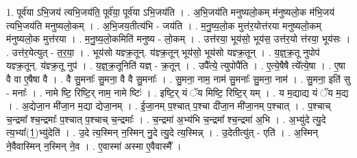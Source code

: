 \documentclass[17pt]{extarticle}
\begin{document}
1. पूर्व॑या ऽभि॒जय॑ त्यभि॒जय॑ति॒ पूर्व॑या॒ पूर्व॑या ऽभि॒जय॑ति । . अ॒भि॒जय॑ति मनुष्यलो॒कम् म॑नुष्यलो॒क म॑भि॒जय॑ त्यभि॒जय॑ति मनुष्यलो॒कम् । . अ॒भि॒जय॒तीत्य॑भि - जय॑ति । . म॒नु॒ष्य॒लो॒क मुत्त॑र॒योत्त॑रया मनुष्यलो॒कम् म॑नुष्यलो॒क मुत्त॑रया । . म॒नु॒ष्य॒लो॒कमिति॑ मनुष्य - लो॒कम् । . उत्त॑रया॒ भूय॑सो॒ भूय॑स॒ उत्त॑र॒यो त्त॑रया॒ भूय॑सः । . उत्त॑र॒येत्युत् - त॒र॒या॒ । . भूय॑सो यज्ञ्क्र॒तून्. य॑ज्ञ्क्र॒तून् भूय॑सो॒ भूय॑सो यज्ञ्क्र॒तून् । . य॒ज्ञ्॒क्र॒तू नुपोप॑ यज्ञ्क्र॒तून्. य॑ज्ञ्क्र॒तू नुप॑ । . य॒ज्ञ्॒क्र॒तूनिति॑ यज्ञ् - क्र॒तून् । . उपै᳚त्ये॒ त्युपोपै॑ति । . ए॒त्ये॒षैषै त्ये᳚त्ये॒षा । . ए॒षा वै वा ए॒षैषा वै । . वै सु॒मनाः᳚ सु॒मना॒ वै वै सु॒मनाः᳚ । . सु॒मना॒ नाम॒ नाम॑ सु॒मनाः᳚ सु॒मना॒ नाम॑ । . सु॒मना॒ इति॑ सु - मनाः᳚ । . नामे ष्टि॒ रिष्टि॒र् नाम॒ नामे ष्टिः॑ । . इष्टि॒र् यं ॅय मिष्टि॒ रिष्टि॒र् यम् । . य म॒द्याद्य यं ॅय म॒द्य । . अ॒द्येजा॒न मी॑जा॒न म॒द्या द्येजा॒नम् । . ई॒जा॒नम् प॒श्चात् प॒श्चा दी॑जा॒न मी॑जा॒नम् प॒श्चात् । . प॒श्चाच् च॒न्द्रमा᳚ श्च॒न्द्रमाः᳚ प॒श्चात् प॒श्चाच् च॒न्द्रमाः᳚ । . च॒न्द्रमा॑ अ॒भ्य॑भि च॒न्द्रमा᳚ श्च॒न्द्रमा॑ अ॒भि । . अ॒भ्यु॑दे त्यु॒दे त्य॒भ्या᳚(1॒)भ्यु॑देति॑ । . उ॒दे त्य॒स्मिन् न॒स्मिन् नु॒दे त्यु॒दे त्य॒स्मिन्न् । . उ॒देतीत्यु॑त् - एति॑ । . अ॒स्मिन् ने॒वैवास्मिन् न॒स्मिन् ने॒व । . ए॒वास्मा॑ अस्मा ए॒वैवास्मै᳚ । \newline
\end{document}
